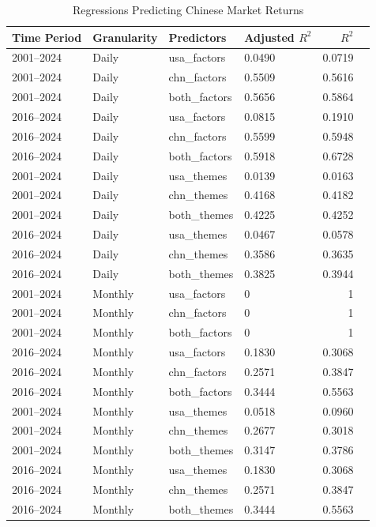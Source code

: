 \begin{table}[htbp]
\centering
\caption{Regressions Predicting Chinese Market Returns}
\label{tab:chn_market_regression_summary}
\begin{tabular}{@{}llllrr@{}}
\toprule
Time Period & Granularity & Predictors & Adjusted $R^2$ & $R^2$ \\ \midrule
2001--2024 & Daily   &  usa\_factors  & 0.0490  & 0.0719 \\
2001--2024 & Daily   &  chn\_factors  & 0.5509  & 0.5616 \\
2001--2024 & Daily   &  both\_factors & 0.5656  & 0.5864 \\
2016--2024 & Daily   &  usa\_factors  & 0.0815  & 0.1910 \\
2016--2024 & Daily   &  chn\_factors  & 0.5599  & 0.5948 \\
2016--2024 & Daily   &  both\_factors & 0.5918  & 0.6728 \\
2001--2024 & Daily   &  usa\_themes   & 0.0139  & 0.0163 \\
2001--2024 & Daily   &  chn\_themes   & 0.4168  & 0.4182 \\
2001--2024 & Daily   &  both\_themes  & 0.4225  & 0.4252 \\
2016--2024 & Daily   &  usa\_themes   & 0.0467  & 0.0578 \\
2016--2024 & Daily   &  chn\_themes   & 0.3586  & 0.3635 \\
2016--2024 & Daily   &  both\_themes  & 0.3825  & 0.3944 \\
2001--2024 & Monthly &  usa\_factors  & 0  & 1 \\
2001--2024 & Monthly &  chn\_factors  & 0  & 1 \\
2001--2024 & Monthly &  both\_factors & 0  & 1 \\
2016--2024 & Monthly &  usa\_factors  & 0.1830  & 0.3068 \\
2016--2024 & Monthly &  chn\_factors  & 0.2571  & 0.3847 \\
2016--2024 & Monthly &  both\_factors & 0.3444  & 0.5563 \\
2001--2024 & Monthly &  usa\_themes   & 0.0518  & 0.0960 \\
2001--2024 & Monthly &  chn\_themes   & 0.2677  & 0.3018 \\
2001--2024 & Monthly &  both\_themes  & 0.3147  & 0.3786 \\
2016--2024 & Monthly &  usa\_themes   & 0.1830  & 0.3068 \\
2016--2024 & Monthly &  chn\_themes   & 0.2571  & 0.3847 \\
2016--2024 & Monthly &  both\_themes  & 0.3444  & 0.5563 \\ \bottomrule
\end{tabular}
\end{table}



